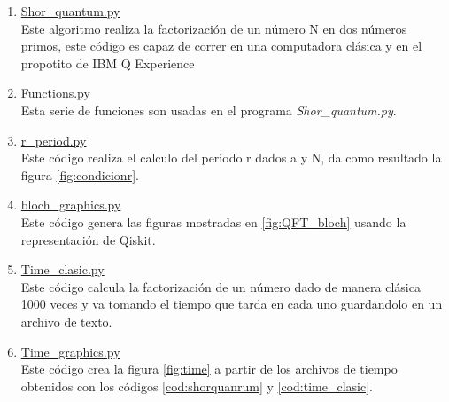 \begin{enumerate}
    \item \label{cod:shorquanrum} \href{https://github.com/giovannilopez9808/Notas_Agosto_2020/blob/master/AMC/Proyecto_final/Scripts/General/Shor_quantum.py}{Shor\_quantum.py}\\
    Este algoritmo realiza la factorización de un número N en dos números primos, este código es capaz de correr en una computadora clásica y en el propotito de IBM Q Experience
    \item \href{https://github.com/giovannilopez9808/Notas_Agosto_2020/blob/master/AMC/Proyecto_final/Scripts/General/Functions.py}{Functions.py \label{cod:functionsshor}}\\
    Esta serie de funciones son usadas en el programa \textit{Shor\_quantum.py}.
    \item \href{https://github.com/giovannilopez9808/Notas_Agosto_2020/blob/master/AMC/Proyecto_final/Scripts/General/r_period.py}{r\_period.py \label{cod:rperiod}}\\
    Este código realiza el calculo del periodo r dados a y N, da como resultado la figura  \ref{fig:condicionr}.
    \item \href{https://github.com/giovannilopez9808/Notas_Agosto_2020/blob/master/AMC/Proyecto_final/Scripts/General/bloch_graphics.py}{bloch\_graphics.py \label{cod:bloch}}\\
    Este código genera las figuras mostradas en \ref{fig:QFT_bloch} usando la representación de Qiskit.
    \item \href{https://github.com/giovannilopez9808/Notas_Agosto_2020/blob/master/AMC/Proyecto_final/Scripts/General/Time_clasic.py}{Time\_clasic.py \label{cod:time_clasic}}\\
    Este código calcula la factorización de un número dado de manera clásica 1000 veces y va tomando el tiempo que tarda en cada uno guardandolo en un archivo de texto.
    \item \href{https://github.com/giovannilopez9808/Notas_Agosto_2020/blob/master/AMC/Proyecto_final/Scripts/General/Time_graphics.py}{Time\_graphics.py \label{cod:time_graphics}}\\
    Este código crea la figura \ref{fig:time} a partir de los archivos de tiempo obtenidos con los códigos \ref{cod:shorquanrum} y \ref{cod:time_clasic}.
\end{enumerate}